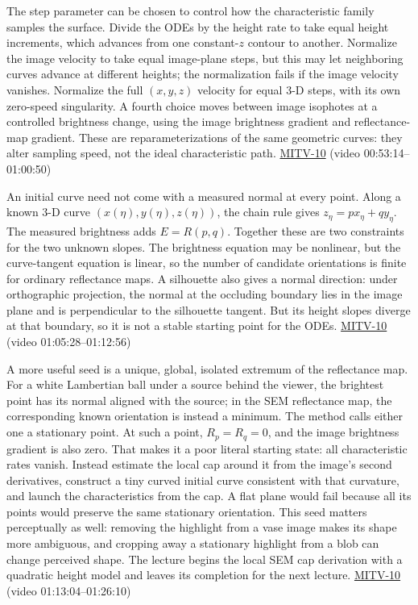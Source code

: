 The step parameter can be chosen to control how the characteristic family samples the surface. Divide the ODEs by the height rate to take equal height increments, which advances from one constant-\(z\) contour to another. Normalize the image velocity to take equal image-plane steps, but this may let neighboring curves advance at different heights; the normalization fails if the image velocity vanishes. Normalize the full \((x,y,z)\) velocity for equal 3-D steps, with its own zero-speed singularity. A fourth choice moves between image isophotes at a controlled brightness change, using the image brightness gradient and reflectance-map gradient. These are reparameterizations of the same geometric curves: they alter sampling speed, not the ideal characteristic path. \hyperref[04-visual-computing-ii-ch036-mitv-10---characteristic-strip-expansion-shape-from-shading-iterative-solutions]{MITV-10} (video 00:53:14--01:00:50)

An initial curve need not come with a measured normal at every point. Along a known 3-D curve \((x(\eta),y(\eta),z(\eta))\), the chain rule gives \(z_\eta=p x_\eta+q y_\eta\). The measured brightness adds \(E=R(p,q)\). Together these are two constraints for the two unknown slopes. The brightness equation may be nonlinear, but the curve-tangent equation is linear, so the number of candidate orientations is finite for ordinary reflectance maps. A silhouette also gives a normal direction: under orthographic projection, the normal at the occluding boundary lies in the image plane and is perpendicular to the silhouette tangent. But its height slopes diverge at that boundary, so it is not a stable starting point for the ODEs. \hyperref[04-visual-computing-ii-ch036-mitv-10---characteristic-strip-expansion-shape-from-shading-iterative-solutions]{MITV-10} (video 01:05:28--01:12:56)

A more useful seed is a unique, global, isolated extremum of the reflectance map. For a white Lambertian ball under a source behind the viewer, the brightest point has its normal aligned with the source; in the SEM reflectance map, the corresponding known orientation is instead a minimum. The method calls either one a stationary point. At such a point, \(R_p=R_q=0\), and the image brightness gradient is also zero. That makes it a poor literal starting state: all characteristic rates vanish. Instead estimate the local cap around it from the image's second derivatives, construct a tiny curved initial curve consistent with that curvature, and launch the characteristics from the cap. A flat plane would fail because all its points would preserve the same stationary orientation. This seed matters perceptually as well: removing the highlight from a vase image makes its shape more ambiguous, and cropping away a stationary highlight from a blob can change perceived shape. The lecture begins the local SEM cap derivation with a quadratic height model and leaves its completion for the next lecture. \hyperref[04-visual-computing-ii-ch036-mitv-10---characteristic-strip-expansion-shape-from-shading-iterative-solutions]{MITV-10} (video 01:13:04--01:26:10)

